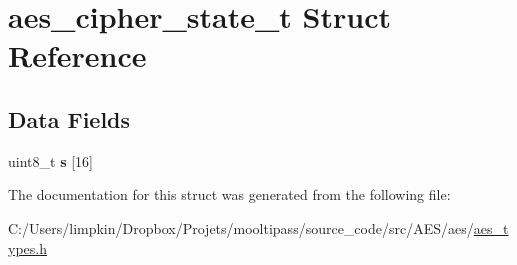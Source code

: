 \hypertarget{structaes__cipher__state__t}{\section{aes\-\_\-cipher\-\_\-state\-\_\-t Struct Reference}
\label{structaes__cipher__state__t}
}
\subsection*{Data Fields}
\begin{DoxyCompactItemize}
\item 
\hypertarget{structaes__cipher__state__t_ae9267f97d76009b78c1502fc433d0f97}{uint8\-\_\-t {\bfseries s} \mbox{[}16\mbox{]}}\label{structaes__cipher__state__t_ae9267f97d76009b78c1502fc433d0f97}

\end{DoxyCompactItemize}


The documentation for this struct was generated from the following file\-:\begin{DoxyCompactItemize}
\item 
C\-:/\-Users/limpkin/\-Dropbox/\-Projets/mooltipass/source\-\_\-code/src/\-A\-E\-S/aes/\hyperlink{aes__types_8h}{aes\-\_\-types.\-h}\end{DoxyCompactItemize}
